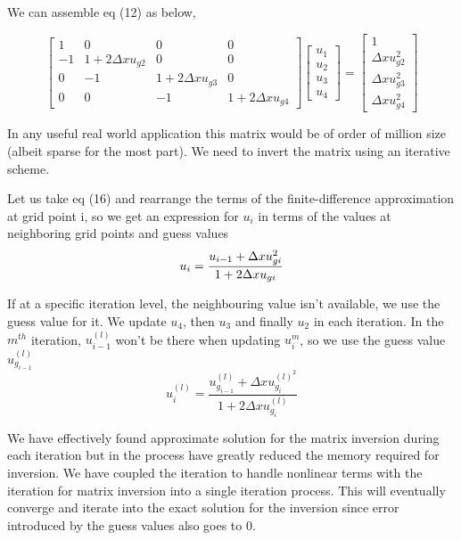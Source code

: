 \documentclass[12pt]{article}
\begin{document}
We can assemble eq (12) as below, 

\begin{equation}
\begin{bmatrix}
1 & 0 & 0 & 0\\
-1 & 1+2 \Delta x u_{g2} & 0 & 0\\
0 & -1 & 1+2 \Delta x u_{g3} & 0\\
0 & 0 & -1 & 1+2 \Delta x u_{g4}
\end{bmatrix}
\begin{bmatrix}
u_1\\
u_2\\
u_3\\
u_4
\end{bmatrix}
=
\begin{bmatrix}
1\\
\Delta x u^{2}_{g2}\\
\Delta x u^{2}_{g3}\\
\Delta x u^{2}_{g4}
\end{bmatrix}
\end{equation}

In any useful real world application this matrix would be of order of million size (albeit sparse for the most part). We need to invert the matrix using an iterative scheme.

Let us take eq (16) and rearrange the terms of the finite-difference approximation at grid point i, so we get an expression for $u_i$ in terms of the values at neighboring grid points and guess values
\begin{equation}
    u_i =\frac{ u_{i-1} + \Delta x \space u^2_{gi}}{1 + 2 \Delta x \space u_{gi}}
\end{equation}

If at a specific iteration level, the neighbouring value isn't available, we use the guess value for it. We update $u_4$, then $u_3$ and finally $u_2$ in each iteration. In the $m^{th}$ iteration, $u^{(l)}_{i-1}$ won't be there when updating $u^m_{i}$, so we use the guess value $ u^{(l)}_{g_{i-1}}$
\begin{equation}
    u_i^{(l)} = \frac{u_{g_{i-1}}^{(l)} + \Delta x u^{(l)^{2}}_{g_{i}}}{1+ 2 \Delta x u^{(l)}_{g_{i}}}
\end{equation}

We have effectively found approximate solution for the matrix inversion during each iteration but in the process have greatly reduced the memory required for inversion. We have coupled the iteration to handle nonlinear terms with the iteration for matrix inversion into a single iteration process. This will eventually converge and iterate into the exact solution for the inversion since error introduced by the guess values also goes to 0.
\end{document}
